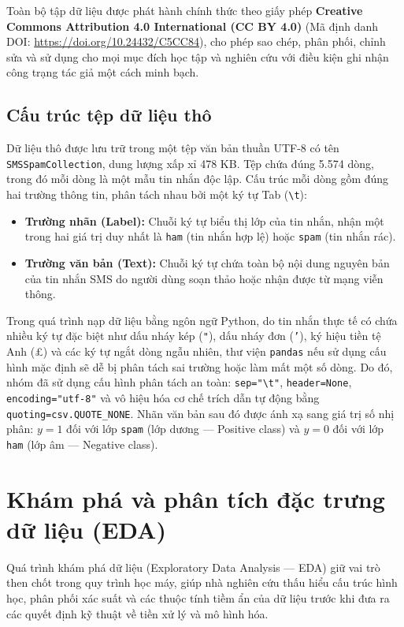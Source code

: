 Toàn bộ tập dữ liệu được phát hành chính thức theo giấy phép \textbf{Creative Commons Attribution 4.0 International (CC BY 4.0)} (Mã định danh DOI: \url{https://doi.org/10.24432/C5CC84}), cho phép sao chép, phân phối, chỉnh sửa và sử dụng cho mọi mục đích học tập và nghiên cứu với điều kiện ghi nhận công trạng tác giả một cách minh bạch.

\subsection{Cấu trúc tệp dữ liệu thô}
Dữ liệu thô được lưu trữ trong một tệp văn bản thuần UTF-8 có tên \texttt{SMSSpamCollection}, dung lượng xấp xỉ 478 KB. Tệp chứa đúng 5.574 dòng, trong đó mỗi dòng là một mẫu tin nhắn độc lập. Cấu trúc mỗi dòng gồm đúng hai trường thông tin, phân tách nhau bởi một ký tự Tab (\texttt{\textbackslash{}t}):
\begin{itemize}
    \item \textbf{Trường nhãn (Label):} Chuỗi ký tự biểu thị lớp của tin nhắn, nhận một trong hai giá trị duy nhất là \texttt{ham} (tin nhắn hợp lệ) hoặc \texttt{spam} (tin nhắn rác).
    \item \textbf{Trường văn bản (Text):} Chuỗi ký tự chứa toàn bộ nội dung nguyên bản của tin nhắn SMS do người dùng soạn thảo hoặc nhận được từ mạng viễn thông.
\end{itemize}

Trong quá trình nạp dữ liệu bằng ngôn ngữ Python, do tin nhắn thực tế có chứa nhiều ký tự đặc biệt như dấu nháy kép (\texttt{"}), dấu nháy đơn (\texttt{'}), ký hiệu tiền tệ Anh (£) và các ký tự ngắt dòng ngẫu nhiên, thư viện \texttt{pandas} nếu sử dụng cấu hình mặc định sẽ dễ bị phân tách sai trường hoặc làm mất một số dòng. Do đó, nhóm đã sử dụng cấu hình phân tách an toàn: \texttt{sep="\textbackslash{}t"}, \texttt{header=None}, \texttt{encoding="utf-8"} và vô hiệu hóa cơ chế trích dẫn tự động bằng \texttt{quoting=csv.QUOTE\_NONE}. Nhãn văn bản sau đó được ánh xạ sang giá trị số nhị phân: $y = 1$ đối với lớp \texttt{spam} (lớp dương --- Positive class) và $y = 0$ đối với lớp \texttt{ham} (lớp âm --- Negative class).

\section{Khám phá và phân tích đặc trưng dữ liệu (EDA)}
\label{sec:eda}

Quá trình khám phá dữ liệu (Exploratory Data Analysis --- EDA) giữ vai trò then chốt trong quy trình học máy, giúp nhà nghiên cứu thấu hiểu cấu trúc hình học, phân phối xác suất và các thuộc tính tiềm ẩn của dữ liệu trước khi đưa ra các quyết định kỹ thuật về tiền xử lý và mô hình hóa.

